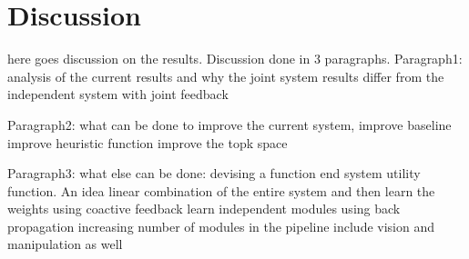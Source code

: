 \section{Discussion}
here goes discussion on the results.
Discussion done in 3 paragraphs.
Paragraph1:
analysis of the current results and why the joint system results differ from the independent system with joint feedback

Paragraph2:
what can be done to improve the current system, improve baseline
improve heuristic function
improve the topk space

Paragraph3:
what else can be done:
devising a function end system utility function.
An idea linear combination of the entire system and then learn the weights using coactive feedback
learn independent modules using back propagation
increasing number of modules in the pipeline include vision and manipulation as well

